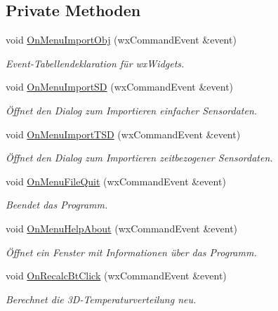 \subsection*{Private Methoden}
\begin{DoxyCompactItemize}
\item 
void \hyperlink{classGUIMainWindow_a9fd9f2be8f45cb5433193f5d28c924bc}{On\-Menu\-Import\-Obj} (wx\-Command\-Event \&event)
\begin{DoxyCompactList}\small\item\em Event-\/\-Tabellendeklaration für wx\-Widgets. \end{DoxyCompactList}\item 
void \hyperlink{classGUIMainWindow_a405b99746fe6f35ec527c57604e53ce2}{On\-Menu\-Import\-S\-D} (wx\-Command\-Event \&event)
\begin{DoxyCompactList}\small\item\em Öffnet den Dialog zum Importieren einfacher Sensordaten. \end{DoxyCompactList}\item 
void \hyperlink{classGUIMainWindow_ab6b1fb242c4b529764093a092349f560}{On\-Menu\-Import\-T\-S\-D} (wx\-Command\-Event \&event)
\begin{DoxyCompactList}\small\item\em Öffnet den Dialog zum Importieren zeitbezogener Sensordaten. \end{DoxyCompactList}\item 
void \hyperlink{classGUIMainWindow_a594fc9fea2ef8cc4febc3c48c0e260c4}{On\-Menu\-File\-Quit} (wx\-Command\-Event \&event)
\begin{DoxyCompactList}\small\item\em Beendet das Programm. \end{DoxyCompactList}\item 
void \hyperlink{classGUIMainWindow_acefa13614ee8e5fc228fc577b7471b26}{On\-Menu\-Help\-About} (wx\-Command\-Event \&event)
\begin{DoxyCompactList}\small\item\em Öffnet ein Fenster mit Informationen über das Programm. \end{DoxyCompactList}\item 
void \hyperlink{classGUIMainWindow_a0c2de30274c7f52ff74ec1217e47a9e5}{On\-Recalc\-Bt\-Click} (wx\-Command\-Event \&event)
\begin{DoxyCompactList}\small\item\em Berechnet die 3\-D-\/\-Temperaturverteilung neu. \end{DoxyCompactList}\item 

\end{DoxyCompactItemize}
